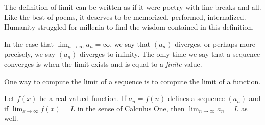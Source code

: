 \documentclass{ximera}
\begin{document}
\begin{question}
    \begin{multipleChoice}
    \end{multipleChoice}
              

  The definition of limit can be written as if it were poetry with
  line breaks and all.  Like the best of poems, it deserves to be
  memorized, performed, internalized.  Humanity struggled for millenia
  to find the wisdom contained in this definition.
\end{question}

\begin{warning}
  In the case that $\lim_{n \to \infty} a_n = \infty$, we say that
  $(a_n)$ diverges, or perhaps more precisely, we say $(a_n)$ diverges to
  infinity.  The only time we say that a sequence converges is when
  the limit exists and is equal to a \textit{finite} value.
\end{warning}


One way to compute the limit of a sequence is to compute the limit of
a function.
\begin{theorem}
  \label{theorem:compute-limit-of-sequence-via-function}
  Let $f(x)$ be a real-valued function.  If $a_n = f(n)$ defines a
  sequence $(a_n)$ and if $\lim_{x\to\infty}f(x)=L$ in the sense of Calculus
  One, then $\lim_{n\to\infty} a_n=L$ as well.
\end{theorem}
\end{document}
